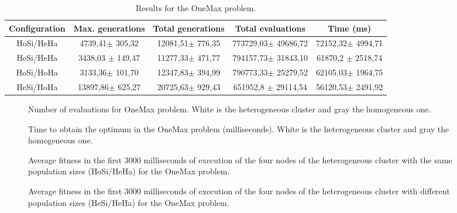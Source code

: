 \begin{table*}
\centering
\caption{Results for the OneMax problem.}
\begin{tabular}{|c|c|c|c|c|} \hline
Configuration & Max. generations      & Total generations     &   Total evaluations     & Time (ms) \\ \hline
HoSi/HeHa   & 4739,41$\pm$  305,32    & 12081,51$\pm$ 776,35  & 773729,03$\pm$  49686,72  & 72152,32$\pm$ 4994,71 \\ \hline
HeSi/HeHa   & 3438,03 $\pm$ 149,47 &  11277,33$\pm$ 471,77 &  794157,73$\pm$  31843,10  & 61870,2 $\pm$ 2518,74 \\ \hline \hline
HoSi/HoHa   & 3133,36$\pm$  101,70  & 12347,83$\pm$ 394,99  & 790773,33$\pm$  25279,52  & 62105,03$\pm$ 1964,75 \\ \hline
HeSi/HoHa   & 13897,86$\pm$ 625,27    & 20725,63$\pm$ 929,43  & 651952,8 $\pm$  29114,54  & 56120,53$\pm$ 2491,92 \\ \hline
\end{tabular}
\label{tab:onemaxresults}
\end{table*}

\begin{figure}
\centering
{}
\caption{Number of evaluations for OneMax problem. White is the heterogeneous cluster and gray the homogeneous one.}
\label{fig:evalsOneMax}
\end{figure}

\begin{figure}
\centering
{}
\caption{Time to obtain the optimum in the OneMax problem (milliseconds). White is the heterogeneous cluster and gray the homogeneous one.}
\label{fig:timeOneMax}
\end{figure}

\begin{figure*}
\centering
{}
\caption{Average fitness in the first 3000 milliseconds of execution of the four nodes of the heterogeneous cluster with the same population sizes (HoSi/HeHa) for the OneMax problem.}
\label{fig:gensonemaxhomosize}
\end{figure*}

\begin{figure*}
\centering
{}
\caption{Average fitness in the first 3000 milliseconds of execution of the four nodes of the heterogeneous cluster with different population sizes (HeSi/HeHa) for the OneMax problem.}
\label{fig:gensonemaxheterosize}
\end{figure*}

